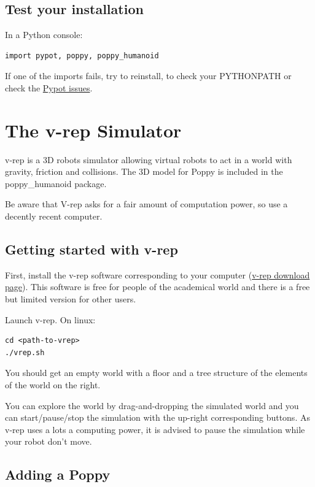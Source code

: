\documentclass{article}
\begin{document}
\subsection{Test your installation}

In a Python console:

\begin{verbatim}
import pypot, poppy, poppy_humanoid
\end{verbatim}

If one of the imports fails, try to reinstall, to check your PYTHONPATH or check the \href{https://github.com/poppy-project/pypot/issues}{Pypot issues}.



\section{The v-rep Simulator}
\label{v-rep}

v-rep is a 3D robots simulator allowing virtual robots to act in a world with gravity, friction and collisions. The 3D model for Poppy is included in the poppy\_humanoid package.

Be aware that V-rep asks for a fair amount of computation power, so use a decently recent computer.

\subsection{Getting started with v-rep}

First, install the v-rep software corresponding to your computer (\href{http://www.coppeliarobotics.com/downloads.html}{v-rep download page}). This software is free for people of the academical world and there is a free but limited version for other users.

Launch v-rep. On linux:

\begin{verbatim}
cd <path-to-vrep>
./vrep.sh
\end{verbatim}

You should get an empty world with a floor and a tree structure of the elements of the world on the right.

You can explore the world by drag-and-dropping the simulated world and you can start/pause/stop the simulation with the up-right corresponding buttons. As v-rep uses a lots a computing power, it is advised to pause the simulation while your robot don't move.

\subsection{Adding a Poppy}
\end{document}
